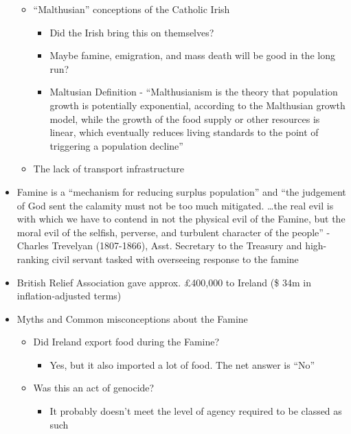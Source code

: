 \documentclass[12pt]{article}
\begin{document}
\begin{itemize}
\begin{itemize}
                    \item ``Malthusian'' conceptions of the Catholic Irish
                    \begin{itemize}
                        \item Did the Irish bring this on themselves?
                        \item Maybe famine, emigration, and mass death will be good in the long run?
                        \item Maltusian Definition - ``Malthusianism is the theory that population growth is potentially exponential, according to the Malthusian growth model, while the growth of the food supply or other resources is linear, which eventually reduces living standards to the point of triggering a population decline''
                    \end{itemize}
                    \item The lack of transport infrastructure
                \end{itemize}
                \item Famine is a ``mechanism for reducing surplus population'' and ``the judgement of God sent the calamity must not be too much mitigated. \dots the real evil is with which we have to contend in not the physical evil of the Famine, but the moral evil of the selfish, perverse, and turbulent character of the people'' -Charles Trevelyan (1807-1866), Asst. Secretary to the Treasury and high-ranking civil servant tasked with overseeing response to the famine
                \item British Relief Association gave approx. £400,000 to Ireland (\$ 34m in inflation-adjusted terms)
                \item Myths and Common misconceptions about the Famine
                \begin{itemize}
                    \item Did Ireland export food during the Famine?
                    \begin{itemize}
                        \item Yes, but it also imported a lot of food. The net answer is ``No''
                    \end{itemize}
                    \item Was this an act of genocide?
                    \begin{itemize}
                        \item It probably doesn't meet the level of agency required to be classed as such

\end{itemize}
\end{itemize}
\end{itemize}
\end{document}
